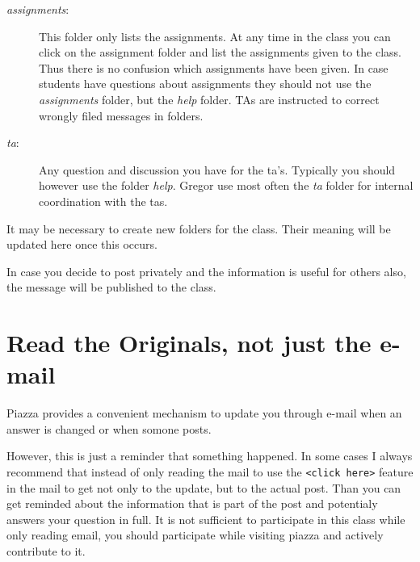 \begin{description}
\item[\emph{assignments}:]
This folder only lists the assignments. At any time in the class you can
click on the assignment folder and list the assignments given to the
class. Thus there is no confusion which assignments have been given. In
case students have questions about assignments they should not use the
\emph{assignments} folder, but the \emph{help} folder. TAs are
instructed to correct wrongly filed messages in folders.
\item[\emph{ta}:]
Any question and discussion you have for the ta's. Typically you should
however use the folder \emph{help}. Gregor use most often the \emph{ta}
folder for internal coordination with the tas.
\end{description}

It may be necessary to create new folders for the class. Their meaning
will be updated here once this occurs.

In case you decide to post privately and the information is useful for
others also, the message will be published to the class.


\section{Read the Originals, not just the e-mail}

Piazza provides a convenient mechanism to update you through e-mail
when an answer is changed or when somone posts.


However, this is just a reminder that something happened. In some
cases I always recommend that instead of only reading the mail to use
the \verb|<click here>| feature in the mail to get not only to the update,
but to the actual post. Than you can get reminded about the 
information that is part of the post and potentialy answers your
question in full. It is not sufficient to participate in this class
while only reading email, you should participate while visiting piazza
and actively contribute to it.

